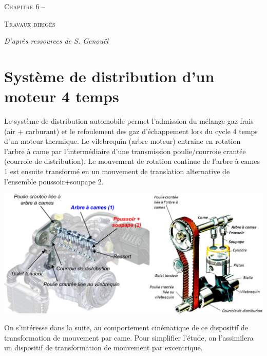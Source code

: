 \documentclass[10pt]{article}
\begin{document}

\begin{center}
\large{\textsc{Chapitre 6 -- }}
\end{center}

\begin{center}
\textsc{Travaux dirigés}
\end{center}

\normalsize

\begin{flushright}
\textit{D'après ressources de S. Genouël}
\end{flushright}

  \renewcommand{\baselinestretch}{1.2}




\section*{Système de distribution d'un moteur 4 temps}
\setcounter{subparagraph}{0}

 
Le système de distribution automobile permet l’admission du mélange gaz frais (air + carburant) et le 
refoulement des gaz d’échappement lors du cycle 4 temps d’un moteur thermique. 
Le vilebrequin (arbre moteur) entraine en rotation l’arbre à came par l’intermédiaire d’une transmission 
poulie/courroie crantée (courroie de distribution). Le mouvement de rotation continue de l’arbre à cames 1 
est ensuite transformé en un mouvement de translation alternative de l’ensemble poussoir+soupape 2.

\begin{center}
\includegraphics[width=.8\textwidth]{images/fig_01}
\end{center}
On s’intéresse dans la suite, au comportement cinématique de ce dispositif de transformation de mouvement 
par came. Pour simplifier l’étude, on l’assimilera un dispositif de transformation de mouvement par 
excentrique. 
\end{document}
